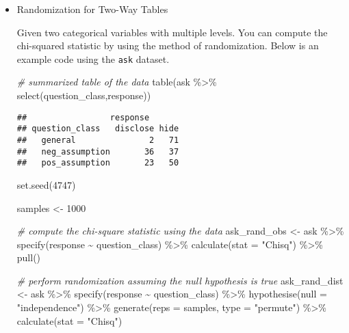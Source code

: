 \documentclass[
]{article}
\newenvironment{Shaded}{\begin{snugshade}}{\end{snugshade}}
\newcommand{\AttributeTok}[1]{\textcolor[rgb]{0.77,0.63,0.00}{#1}}
\newcommand{\CommentTok}[1]{\textcolor[rgb]{0.56,0.35,0.01}{\textit{#1}}}
\newcommand{\DecValTok}[1]{\textcolor[rgb]{0.00,0.00,0.81}{#1}}
\newcommand{\FunctionTok}[1]{\textcolor[rgb]{0.00,0.00,0.00}{#1}}
\newcommand{\NormalTok}[1]{#1}
\newcommand{\OtherTok}[1]{\textcolor[rgb]{0.56,0.35,0.01}{#1}}
\newcommand{\SpecialCharTok}[1]{\textcolor[rgb]{0.00,0.00,0.00}{#1}}
\newcommand{\StringTok}[1]{\textcolor[rgb]{0.31,0.60,0.02}{#1}}
\begin{document}
\begin{itemize}
\item
  Randomization for Two-Way Tables

  Given two categorical variables with multiple levels. You can compute the chi-squared statistic by using the method of randomization. Below is an example code using the \texttt{ask} dataset.

\begin{Shaded}
\begin{Highlighting}[]
\CommentTok{\# summarized table of the data}
\FunctionTok{table}\NormalTok{(ask }\SpecialCharTok{\%\textgreater{}\%} \FunctionTok{select}\NormalTok{(question\_class,response))}
\end{Highlighting}
\end{Shaded}

\begin{verbatim}
##                 response
## question_class   disclose hide
##   general               2   71
##   neg_assumption       36   37
##   pos_assumption       23   50
\end{verbatim}

\begin{Shaded}
\begin{Highlighting}[]
\FunctionTok{set.seed}\NormalTok{(}\DecValTok{4747}\NormalTok{)}

\NormalTok{samples }\OtherTok{\textless{}{-}} \DecValTok{1000}

\CommentTok{\# compute the chi{-}square statistic using the data}
\NormalTok{ask\_rand\_obs }\OtherTok{\textless{}{-}}\NormalTok{ ask }\SpecialCharTok{\%\textgreater{}\%}
  \FunctionTok{specify}\NormalTok{(response }\SpecialCharTok{\textasciitilde{}}\NormalTok{ question\_class) }\SpecialCharTok{\%\textgreater{}\%}
  \FunctionTok{calculate}\NormalTok{(}\AttributeTok{stat =} \StringTok{"Chisq"}\NormalTok{) }\SpecialCharTok{\%\textgreater{}\%} 
  \FunctionTok{pull}\NormalTok{()}

\CommentTok{\# perform randomization assuming the null hypothesis is true}
\NormalTok{ask\_rand\_dist }\OtherTok{\textless{}{-}}\NormalTok{ ask }\SpecialCharTok{\%\textgreater{}\%}
  \FunctionTok{specify}\NormalTok{(response }\SpecialCharTok{\textasciitilde{}}\NormalTok{ question\_class) }\SpecialCharTok{\%\textgreater{}\%}
  \FunctionTok{hypothesise}\NormalTok{(}\AttributeTok{null =} \StringTok{"independence"}\NormalTok{) }\SpecialCharTok{\%\textgreater{}\%}
  \FunctionTok{generate}\NormalTok{(}\AttributeTok{reps =}\NormalTok{ samples, }\AttributeTok{type =} \StringTok{"permute"}\NormalTok{) }\SpecialCharTok{\%\textgreater{}\%}
  \FunctionTok{calculate}\NormalTok{(}\AttributeTok{stat =} \StringTok{"Chisq"}\NormalTok{)}


\end{Highlighting}
\end{Shaded}
\end{itemize}
\end{document}

